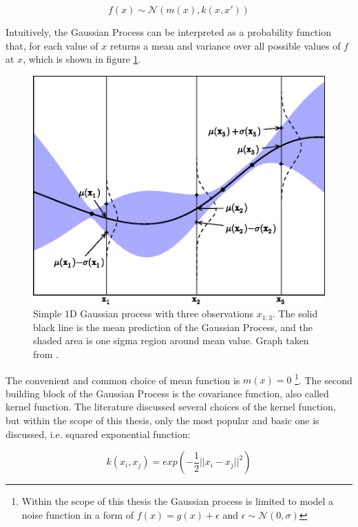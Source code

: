 \begin{equation}
    f(x) \sim  \mathcal{N} \left( m(x), k(x,x')  \right)
\end{equation}

Intuitively, the Gaussian Process can be interpreted as a probability function that, for each value of $x$ returns a mean and variance over all possible values of $f$ at $x$, which is shown in figure \ref{fig:GP}.  
\begin{figure}
\centering
\includegraphics[scale=0.7]{figures/GaussianProcess.png}
\caption{ Simple 1D Gaussian process with three observations $x_{1:3}$. The solid black line is the mean prediction of the Gaussian Process, and the shaded area is one sigma region around mean value.   
Graph taken from \cite{BayesianOpt}.
\label{fig:GP}}
\end{figure}

The convenient and common choice of mean function is $m(x) = 0$ \footnote{ Within the scope of this thesis the Gaussian process is limited to model a noise function in a form of $f(x) = g(x) + \epsilon$ and $\epsilon \sim \mathcal{N}(0, \sigma)$ }. 
The second building block of the Gaussian Process is the covariance function, also called kernel function. The literature discussed several choices of the kernel function, but within the scope of this thesis, only the most popular and basic one is discussed, i.e. squared exponential function: 

\begin{equation}
\label{eq:kernel_function}
    k(x_i,x_j) = exp\left( - \frac{1}{2} ||x_i - x_j||^2 \right)
\end{equation}

